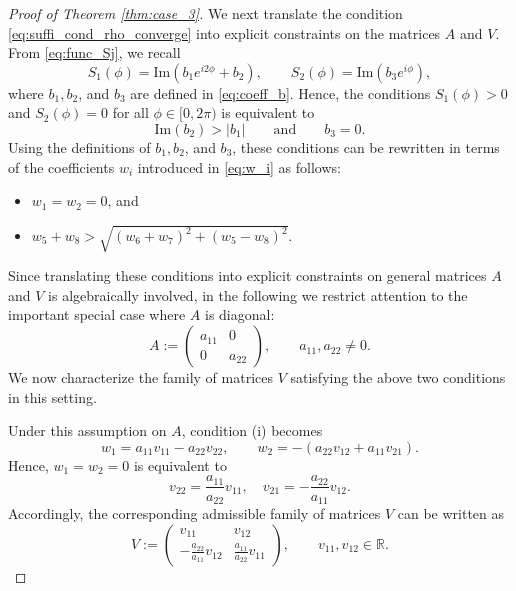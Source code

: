 \documentclass[10pt]{article}
\theoremstyle{definition}
\theoremstyle{definition}
\numberwithin{equation}{section}
\newcommand{\R}{\mathbb{R}}
\newcommand{\im}[1]{\mathrm{Im} \left(#1\right)}
\begin{document}
\begin{proof}[Proof of Theorem \ref{thm:case_3}]
We next translate the condition \eqref{eq:suffi_cond_rho_converge} into explicit constraints on the matrices $A$ and $V$.
From \eqref{eq:func_Sj}, we recall
\begin{equation*}
S_1(\phi) = \im{b_1 e^{i2\phi} + b_2}, \qquad S_2(\phi) = \im{b_3 e^{i\phi}},
\end{equation*}
where $b_1, b_2$, and $b_3$ are defined in \eqref{eq:coeff_b}.
Hence, the conditions $S_1(\phi) > 0$ and $S_2(\phi) = 0$ for all $\phi \in [0, 2\pi)$ is equivalent to
\begin{equation*}
\im{b_2} > |b_1| \qquad \text{and} \qquad b_3 = 0 .
\end{equation*}
Using the definitions of $b_1, b_2$, and $b_3$, these conditions can be rewritten in terms of the coefficients $w_i$ introduced in \eqref{eq:w_i} as follows: 
\begin{itemize}
    \item[(i).] $w_1 = w_2 = 0$, and
    \item[(ii).] $w_5 + w_8 > \sqrt{(w_6 + w_7)^2 + (w_5 - w_8)^2}$.
\end{itemize}
Since translating these conditions into explicit constraints on general matrices $A$ and $V$ is algebraically involved, in the following we restrict attention to the important special case where $A$ is diagonal:
\begin{equation*}
A := \left(\begin{array}{ll}
    a_{11} & 0 \\
    0 & a_{22}
\end{array} \right), \qquad a_{11}, a_{22} \neq 0 .
\end{equation*}
We now characterize the family of matrices $V$ satisfying the above two conditions in this setting.

Under this assumption on $A$, condition (i) becomes
\begin{equation*}
w_1 = a_{11} v_{11} - a_{22} v_{22}, \qquad w_2 = - (a_{22} v_{12} + a_{11} v_{21}) .
\end{equation*}
Hence, $w_1 = w_2 = 0$ is equivalent to
\begin{equation*}
v_{22} = \frac{a_{11}}{a_{22}} v_{11}, \quad v_{21} = - \frac{a_{22}}{a_{11}} v_{12} .
\end{equation*}
Accordingly, the corresponding admissible family of matrices $V$ can be written as
\begin{equation*}
V := \left( \begin{array}{cc}
    v_{11} & v_{12}  \\[4pt]
    -\frac{a_{22}}{a_{11}} v_{12} & \frac{a_{11}}{a_{22}} v_{11} 
\end{array} \right), \qquad  v_{11}, v_{12} \in \R .
\end{equation*}


\end{proof}
\end{document}
